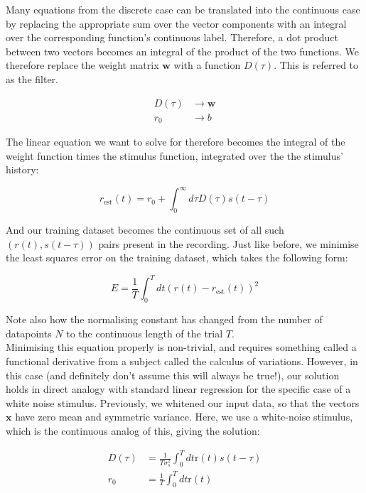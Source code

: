 \documentclass{article}
\begin{document}
Many equations from the discrete case can be translated into the continuous case by replacing the appropriate sum over the vector components with an integral over the corresponding function's continuous label. Therefore, a dot product between two vectors becomes an integral of the product of the two functions. We therefore replace the weight matrix $\bm{w}$ with a function $D(\tau)$. This is referred to as the filter.

\begin{align*}
	D(\tau) & \rightarrow \bm{w} \\
	r_0     & \rightarrow b
\end{align*}

The linear equation we want to solve for therefore becomes the integral of the weight function times the stimulus function, integrated over the the stimulus' history:

\begin{equation*}
	r_{\text{est}}(t) = r_0 + \int_0^\infty d\tau D(\tau)s(t-\tau)
\end{equation*}

And our training dataset becomes the continuous set of all such $(r(t), s(t-\tau))$ pairs present in the recording. Just like before, we minimise the least squares error on the training dataset, which takes the following form:

\begin{equation*}
	E = \frac{1}{T} \int_0^T dt (r(t) - r_{\text{est}}(t))^2
\end{equation*}

Note also how the normalising constant has changed from the number of datapoints $N$ to the continuous length of the trial $T$.\\

Minimising this equation properly is non-trivial, and requires something called a functional derivative from a subject called the calculus of variations. However, in this case (and definitely don't assume this will always be true!), our solution holds in direct analogy with standard linear regression for the specific case of a white noise stimulus. Previously, we whitened our input data, so that the vectors $\bm{x}$ have zero mean and symmetric variance. Here, we use a white-noise stimulus, which is the continuous analog of this, giving the solution:

\begin{align*}
	D(\tau) & = \frac{1}{T\sigma_s^2} \int_0^T dt \text{r}(t) s(t-\tau) \\
	r_0     & = \frac{1}{T} \int_0^T dt \text{r}(t)
\end{align*}
\end{document}
